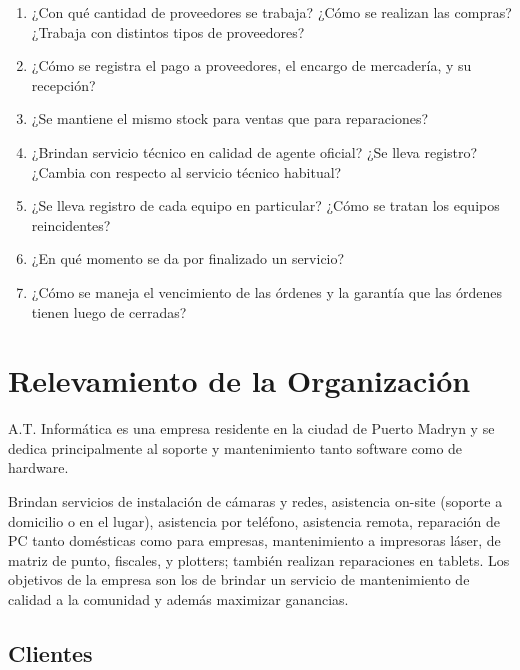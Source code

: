 \documentclass[12pt]{extarticle}
\begin{document}
\begin{spacing}{1.2}
\begin{enumerate}
        \item ¿Con qué cantidad de proveedores se trabaja? ¿Cómo se realizan las compras? ¿Trabaja con distintos tipos de proveedores?
        \item ¿Cómo se registra el pago a proveedores, el encargo de mercadería, y su recepción?
        \item ¿Se mantiene el mismo stock para ventas que para reparaciones?
        \item ¿Brindan servicio técnico en calidad de agente oficial? ¿Se lleva registro? ¿Cambia con respecto al servicio técnico habitual?
        \item ¿Se lleva registro de cada equipo en particular? ¿Cómo se tratan los equipos reincidentes?
        \item ¿En qué momento se da por finalizado un servicio?
        \item ¿Cómo se maneja el vencimiento de las órdenes y la garantía que las órdenes tienen luego de cerradas?
    \end{enumerate}

    \pagebreak









    \section{Relevamiento de la Organización}
    A.T. Informática es una empresa residente en la ciudad de Puerto Madryn y se dedica principalmente al soporte y mantenimiento tanto software como de hardware.

    Brindan servicios de instalación de cámaras y redes, asistencia on-site (soporte a domicilio o en el lugar), asistencia por teléfono, asistencia remota, reparación de PC tanto domésticas como para empresas, mantenimiento a impresoras láser, de matriz de punto, fiscales, y plotters; también realizan reparaciones en tablets.  Los objetivos de la empresa son los de brindar un servicio de mantenimiento de calidad a la comunidad y además maximizar ganancias.\\

    \pagebreak
    \subsection{Clientes}


\end{spacing}
\end{document}
